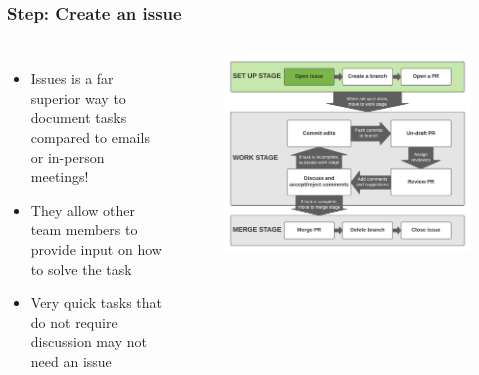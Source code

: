 \documentclass[aspectratio=169]{beamer} %
\begin{document}
\begin{frame}
	\frametitle{Step: Create an issue}
	\begin{columns}[c]

		\begin{itemize}
			\setlength\itemsep{.5em}
			\item Issues is a far superior way to document tasks
			compared to emails or in-person meetings!
			\item They allow other team members to provide input
			on how to solve the task
			\item Very quick tasks that do not require discussion may not need an issue
		\end{itemize}

		\vspace{-.75cm}
		\begin{figure}
			\centering
			\includegraphics[width=\textwidth]{./img/branch-pr-merge-cycle-S1-1.png}
		\end{figure}

	\end{columns}
\end{frame}
\end{document}

